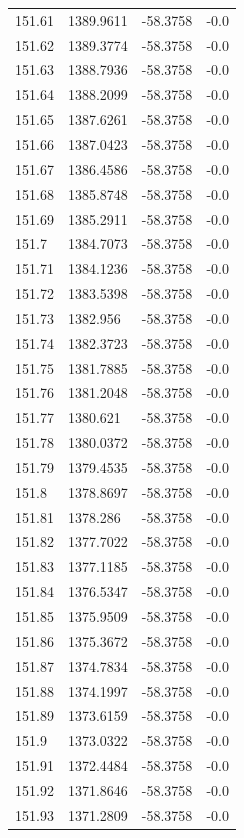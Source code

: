 \begin{table}[H]
\begin{tabular}{llll}
151.61 & 1389.9611 & -58.3758 & -0.0 \\
151.62 & 1389.3774 & -58.3758 & -0.0 \\
151.63 & 1388.7936 & -58.3758 & -0.0 \\
151.64 & 1388.2099 & -58.3758 & -0.0 \\
151.65 & 1387.6261 & -58.3758 & -0.0 \\
151.66 & 1387.0423 & -58.3758 & -0.0 \\
151.67 & 1386.4586 & -58.3758 & -0.0 \\
151.68 & 1385.8748 & -58.3758 & -0.0 \\
151.69 & 1385.2911 & -58.3758 & -0.0 \\
151.7 & 1384.7073 & -58.3758 & -0.0 \\
151.71 & 1384.1236 & -58.3758 & -0.0 \\
151.72 & 1383.5398 & -58.3758 & -0.0 \\
151.73 & 1382.956 & -58.3758 & -0.0 \\
151.74 & 1382.3723 & -58.3758 & -0.0 \\
151.75 & 1381.7885 & -58.3758 & -0.0 \\
151.76 & 1381.2048 & -58.3758 & -0.0 \\
151.77 & 1380.621 & -58.3758 & -0.0 \\
151.78 & 1380.0372 & -58.3758 & -0.0 \\
151.79 & 1379.4535 & -58.3758 & -0.0 \\
151.8 & 1378.8697 & -58.3758 & -0.0 \\
151.81 & 1378.286 & -58.3758 & -0.0 \\
151.82 & 1377.7022 & -58.3758 & -0.0 \\
151.83 & 1377.1185 & -58.3758 & -0.0 \\
151.84 & 1376.5347 & -58.3758 & -0.0 \\
151.85 & 1375.9509 & -58.3758 & -0.0 \\
151.86 & 1375.3672 & -58.3758 & -0.0 \\
151.87 & 1374.7834 & -58.3758 & -0.0 \\
151.88 & 1374.1997 & -58.3758 & -0.0 \\
151.89 & 1373.6159 & -58.3758 & -0.0 \\
151.9 & 1373.0322 & -58.3758 & -0.0 \\
151.91 & 1372.4484 & -58.3758 & -0.0 \\
151.92 & 1371.8646 & -58.3758 & -0.0 \\
151.93 & 1371.2809 & -58.3758 & -0.0 \\

\end{tabular}
\end{table}
